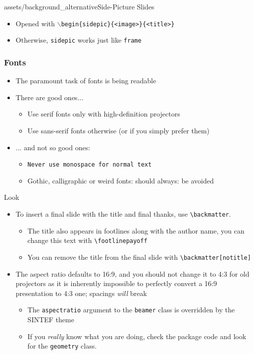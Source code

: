 \begin{sidepic}{assets/background_alternative}{Side-Picture Slides}
\begin{itemize}
\item Opened with \texttt{$\backslash$begin\{sidepic\}\{<image>\}\{<title>\}}
\item Otherwise, \texttt{sidepic} works just like \texttt{frame}
\end{itemize}
\end{sidepic}

\footlinecolor{}
\begin{frame}
\frametitle{Fonts}
\begin{itemize}
\item The paramount task of fonts is being readable
\item There are good ones...
  \begin{itemize}
  \item {\textrm{Use serif fonts only with high-definition projectors}}
  \item {\textsf{Use sans-serif fonts otherwise (or if you simply prefer 
them)}}
  \end{itemize}
\item ... and not so good ones:
  \begin{itemize}
  \item {\texttt{Never use monospace for normal text}}
  \item {\frakfamily Gothic, calligraphic or weird fonts: should always: be
  avoided}
\end{itemize}
\end{itemize}
\end{frame}

\begin{frame}[fragile]{Look}
\begin{itemize}
\item To insert a final slide with the title and final thanks, use \verb|\backmatter|.
      \begin{itemize}
      \item The title also appears in footlines along with the author name, you can change this text with \verb|\footlinepayoff|
      \item You can remove the title from the final slide with \verb|\backmatter[notitle]|
      \end{itemize}
\item The aspect ratio defaults to 16:9, and you should not change it to 4:3
      for old projectors as it is inherently impossible to perfectly convert a 
      16:9 presentation to 4:3 one; spacings \emph{will} break
      \begin{itemize}
      \item The \texttt{aspectratio} argument to the \texttt{beamer} class is
            overridden by the SINTEF theme
      \item If you \emph{really} know what you are doing, check the package
            code and look for the \texttt{geometry} class.
      \end{itemize}
\end{itemize}
\end{frame}

